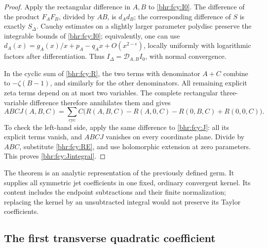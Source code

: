 \begin{proof}
Apply the rectangular difference in \(A,B\) to
\eqref{bhr:fcy:I0}. The difference of the product \(F_AF_B\),
divided by \(AB\), is \(d_Ad_B\); the corresponding difference
of \(S\) is exactly \(S_\Delta\). Cauchy estimates on a slightly
larger parameter polydisc preserve the integrable bounds of
\eqref{bhr:fcy:I0}; equivalently, one can use
\(d_A(x)=g_A(x)/x+p_A-q_Ax+O(x^{2-\epsilon})\), locally
uniformly with logarithmic factors after differentiation. Thus
\(I_\Delta=\mathcal D_{A,B}I_0\), with normal convergence.

In the cyclic sum of \eqref{bhr:fcy:R}, the two terms with
denominator \(A+C\) combine to \(-\zeta(B-1)\), and similarly
for the other denominators. All remaining explicit zeta terms
depend on at most two variables. The complete rectangular
three-variable difference therefore annihilates them and gives
\[
 ABCJ(A,B,C)=\sum_{\mathrm{cyc}}C\bigl(
 R(A,B,C)-R(A,0,C)-R(0,B,C)+R(0,0,C)\bigr).
\]
To check the left-hand side, apply the same difference to
\eqref{bhr:fcy:J}: all its explicit terms vanish, and \(ABCJ\)
vanishes on every coordinate plane. Divide by \(ABC\), substitute
\eqref{bhr:fcy:RE}, and use holomorphic extension at zero parameters.
This proves \eqref{bhr:fcy:Jintegral}.
\end{proof}

The theorem is an analytic representation of the previously defined
germ. It supplies all symmetric jet coefficients in one fixed,
ordinary convergent kernel. Its content includes the endpoint
subtractions and their finite normalization; replacing the kernel by
an unsubtracted integral would not preserve its Taylor coefficients.

\subsection{The first transverse quadratic coefficient}

